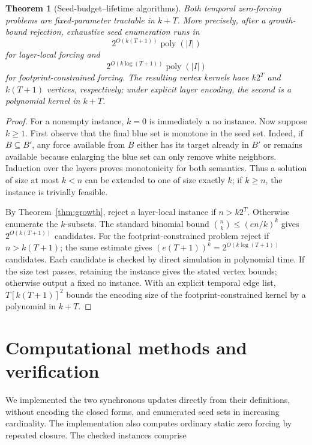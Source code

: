 \documentclass[11pt]{article}
\newtheorem{theorem}{Theorem}[section]
\theoremstyle{definition}
\theoremstyle{remark}
\begin{document}
\begin{theorem}[Seed-budget--lifetime algorithms]\label{thm:fpt}
Both temporal zero-forcing problems are fixed-parameter tractable in
$k+T$.  More precisely, after a growth-bound rejection, exhaustive seed
enumeration runs in
\[
 2^{O(k(T+1))}\operatorname{poly}(|I|)
\]
for layer-local forcing and
\[
 2^{O(k\log(T+1))}\operatorname{poly}(|I|)
\]
for footprint-constrained forcing.  The resulting vertex kernels have
$k2^T$ and $k(T+1)$ vertices, respectively; under explicit layer encoding,
the second is a polynomial kernel in $k+T$.
\end{theorem}

\begin{proof}
For a nonempty instance, $k=0$ is immediately a no instance.  Now suppose
$k\ge1$.  First observe that the final blue set is monotone in the seed set.
Indeed,
if $B\subseteq B'$, any force available from $B$ either has its target already
in $B'$ or remains available because enlarging the blue set can only remove
white neighbors.  Induction over the layers proves monotonicity for both
semantics.  Thus a solution of size at most $k<n$ can be extended to one of
size exactly $k$; if $k\ge n$, the instance is trivially feasible.

By Theorem~\ref{thm:growth}, reject a layer-local instance if $n>k2^T$.
Otherwise enumerate the $k$-subsets.  The standard binomial bound
$\binom{n}{k}\le(en/k)^k$ gives $2^{O(k(T+1))}$ candidates.  For the
footprint-constrained problem reject if $n>k(T+1)$; the same estimate gives
$(e(T+1))^k=2^{O(k\log(T+1))}$ candidates.  Each candidate is checked by
direct simulation in polynomial time.  If the size test passes, retaining
the instance gives the stated vertex bounds; otherwise output a fixed no
instance.  With an explicit temporal edge list, $T[k(T+1)]^2$ bounds the
encoding size of the footprint-constrained kernel by a polynomial in $k+T$.
\end{proof}

\section{Computational methods and verification}

We implemented the two synchronous updates directly from their definitions,
without encoding the closed forms, and enumerated seed sets in increasing
cardinality.  The implementation also
computes ordinary static zero forcing by repeated closure.  The checked
instances comprise
\end{document}

